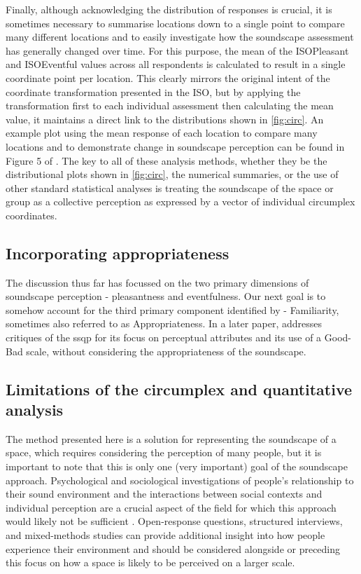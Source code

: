 Finally, although acknowledging the distribution of responses is crucial, it is sometimes necessary to summarise locations down to a single point to compare many different locations and to easily investigate how the soundscape assessment has generally changed over time. For this purpose, the mean of the ISOPleasant and ISOEventful values across all respondents is calculated to result in a single coordinate point per location. This clearly mirrors the original intent of the coordinate transformation presented in the ISO, but by applying the transformation first to each individual assessment then calculating the mean value, it maintains a direct link to the distributions shown in \cref{fig:circ}. An example plot using the mean response of each location to compare many locations and to demonstrate change in soundscape perception can be found in Figure 5 of \citet{Mitchell2021Investigating}. The key to all of these analysis methods, whether they be the distributional plots shown in \cref{fig:circ}, the numerical summaries, or the use of other standard statistical analyses is treating the soundscape of the space or group as a collective perception as expressed by a vector of individual circumplex coordinates.

\subsection{Incorporating appropriateness}

The discussion thus far has focussed on the two primary dimensions of soundscape perception - pleasantness and eventfulness. Our next goal is to somehow account for the third primary component identified by \citet{Axelsson2010principal} - Familiarity, sometimes also referred to as Appropriateness. In a later paper, \citet{Axelsson2015How} addresses critiques of the \gls{ssqp} for its focus on perceptual attributes and its use of a Good-Bad scale, without considering the appropriateness of the soundscape. %


\subsection{Limitations of the circumplex and quantitative analysis}
The method presented here is a solution for representing the soundscape of a space, which requires considering the perception of many people, but it is important to note that this is only one (very important) goal of the soundscape approach. Psychological and sociological investigations of people's relationship to their sound environment and the interactions between social contexts and individual perception are a crucial aspect of the field for which this approach would likely not be sufficient \citep{Bild2018Public}. Open-response questions, structured interviews, and mixed-methods studies can provide additional insight into how people experience their environment and should be considered alongside or preceding this focus on how a space is likely to be perceived on a larger scale.

